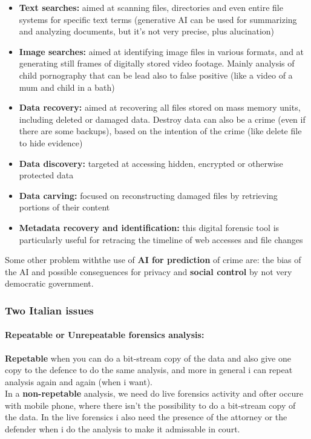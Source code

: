 \begin{itemize}
  \item \textbf{Text searches:} aimed at scanning files, directories and even entire file systems for specific text terms (generative AI can be used for summarizing and analyzing documents, but it's not very precise, plus alucination)

  \item \textbf{Image searches:} aimed at identifying image files in various formats, and at generating still frames of digitally stored video footage. Mainly analysis of child pornography that can be lead also to false positive (like a video of a mum and child in a bath)

  \item \textbf{Data recovery:} aimed at recovering all files stored on mass memory units, including deleted or damaged data. Destroy data can also be a crime (even if there are some backups), based on the intention of the crime (like delete file to hide evidence)

  \item \textbf{Data discovery:} targeted at accessing hidden, encrypted or otherwise protected data

  \item \textbf{Data carving:} focused on reconstructing damaged files by retrieving portions of their content

  \item \textbf{Metadata recovery and identification:} this digital forensic tool is particularly useful for retracing the timeline of web accesses and file changes
\end{itemize}

Some other problem withthe use of \textbf{AI for prediction} of crime are: the bias of the AI and possible conseguences for privacy and \textbf{social control} by not very democratic government.

\subsubsection{Two Italian issues}

\paragraph{Repeatable or Unrepeatable forensics analysis: }
\textbf{Repetable} when you can do a bit-stream copy of the data and also give one copy to the defence to do the same analysis, and more in general i can repeat analysis again and again (when i want). \\ In a \textbf{non-repetable} analysis, we need do live forensics activity and ofter occure with mobile phone, where there isn't the possibility to do a bit-stream copy of the data. In the live forensics i also need the presence of the attorney or the defender when i do the analysis to make it admissable in court.

